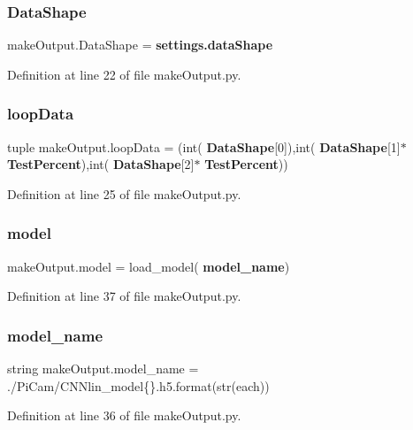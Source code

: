 \subsubsection{Data\+Shape}
{\footnotesize\ttfamily make\+Output.\+Data\+Shape = \textbf{ settings.\+data\+Shape}}



Definition at line 22 of file make\+Output.\+py.

\mbox{\label{namespacemake_output_a07f2a88415c0b6bc137a43cf90159f20}} 
\subsubsection{loop\+Data}
{\footnotesize\ttfamily tuple make\+Output.\+loop\+Data = (int(\textbf{ Data\+Shape}[0]),int(\textbf{ Data\+Shape}[1]$\ast$\textbf{ Test\+Percent}),int(\textbf{ Data\+Shape}[2]$\ast$\textbf{ Test\+Percent}))}



Definition at line 25 of file make\+Output.\+py.

\mbox{\label{namespacemake_output_aa41179dcf40bc56cc0b0235e17f37b22}} 
\subsubsection{model}
{\footnotesize\ttfamily make\+Output.\+model = load\+\_\+model(\textbf{ model\+\_\+name})}



Definition at line 37 of file make\+Output.\+py.

\mbox{\label{namespacemake_output_a70f93afb034b7af241649ccd0b23869f}} 
\subsubsection{model\+\_\+name}
{\footnotesize\ttfamily string make\+Output.\+model\+\_\+name = \textquotesingle{}./Pi\+Cam/C\+N\+Nlin\+\_\+model\{\}.h5\textquotesingle{}.format(str(each))}



Definition at line 36 of file make\+Output.\+py.

\mbox{\label{namespacemake_output_a1c6c636de0f290a409417f9aad481791}} 
